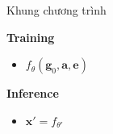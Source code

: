 \documentclass[10pt,mathserif]{beamer}
\begin{document}
\begin{frame}{Khung chương trình}
	
\textbf{Training}
	\begin{itemize}
		\item $f_{\theta}(\mathbf{g}_0, \mathbf{a}, \mathbf{e})$
	\end{itemize}

	
\textbf{Inference}

	\begin{itemize}
		\item $\mathbf{x}' = f_{\theta'}$
	\end{itemize}
\end{frame}



\end{document}
